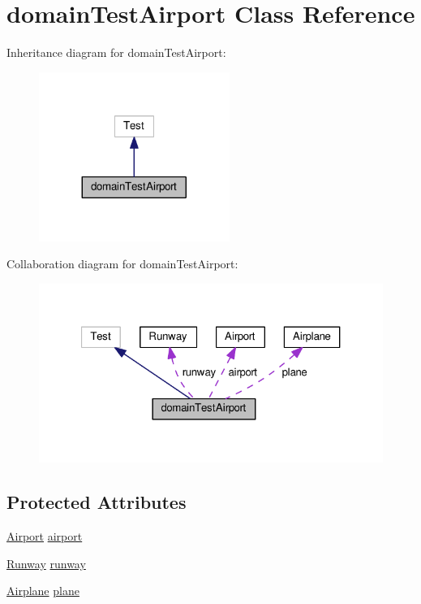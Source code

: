 \hypertarget{classdomainTestAirport}{}\section{domain\+Test\+Airport Class Reference}
\label{classdomainTestAirport}


Inheritance diagram for domain\+Test\+Airport\+:
\nopagebreak
\begin{figure}[H]
\begin{center}
\leavevmode
\includegraphics[width=176pt]{classdomainTestAirport__inherit__graph}
\end{center}
\end{figure}


Collaboration diagram for domain\+Test\+Airport\+:
\nopagebreak
\begin{figure}[H]
\begin{center}
\leavevmode
\includegraphics[width=321pt]{classdomainTestAirport__coll__graph}
\end{center}
\end{figure}
\subsection*{Protected Attributes}
\begin{DoxyCompactItemize}
\item 
\hyperlink{classAirport}{Airport} \hyperlink{classdomainTestAirport_afa24e8a08b5107bc45c9188eb914803c}{airport}
\item 
\hyperlink{classRunway}{Runway} \hyperlink{classdomainTestAirport_a0d88cd4618213d454a565d95b5b6c5db}{runway}
\item 
\hyperlink{classAirplane}{Airplane} \hyperlink{classdomainTestAirport_af38b399f44ab9ed6d563f8c008bc1986}{plane}
\end{DoxyCompactItemize}


